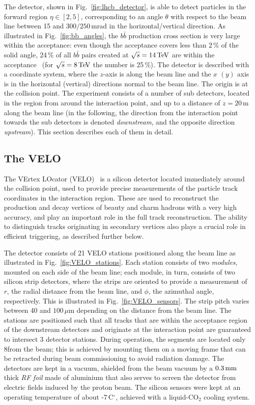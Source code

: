 The \lhcb detector, shown in Fig.~\ref{fig:lhcb_detector},  is able to detect particles in the forward region $\eta\in[2, 5]$, corresponding to an angle $\theta$ with respect to the beam line between 15 and $300/250$\,mrad in the horizontal/vertical direction. As illustrated in Fig.~\ref{fig:bb_angles}, the $b\bar b$ production cross section is very large within the \lhcb acceptance: even though the acceptance covers less than 2\,\% of the solid angle,  24\,\% of all $b\bar b$ pairs created at $\sqrt{s}=14\text{\,Te\kern -0.1em V}$ are within the acceptance~\cite{bbangles} (for $\sqrt{s}=8\text{\,Te\kern -0.1em V}$ the number is 25\,\%). The detector is described with a coordinate system, where the $z$-axis is along the beam line and the $x$ $(y)$ axis is in the horizontal (vertical) directions normal to the beam line. The origin is at the collision point. The experiment consists of a number of sub detectors, located in the region from around the interaction point, and up to a distance of $z=20\,$m along the beam line (in the following, the direction from the interaction point towards the sub detectors is denoted \emph{downstream}, and the opposite direction \emph{upstream}). This section describes each of them in detail.
 
\subsection{The VELO} %
\label{sub:the_velo}
The VErtex LOcator (VELO)~\cite{VELO-TDR} is a silicon detector located immediately around the collision point, used to provide precise measurements of the particle track coordinates in the interaction region. These are used to reconstruct the production and decay vertices of beauty and charm hadrons with a very high accuracy,  and play an important role in the full track reconstruction. The ability to distinguish tracks originating in secondary vertices also plays a crucial role in efficient triggering, as described further below.

The detector consists of 21 VELO stations positioned along the beam line as illustrated in Fig.~\ref{fig:VELO_stations}. Each station consists of two \emph{modules}, mounted on each side of the beam line; each module, in turn, consists of two silicon strip detectors,  where the strips are oriented to provide a measurement of $r$, the radial distance from the beam line, and  $\phi$, the azimuthal angle, respectively. This is illustrated in Fig.~\ref{fig:VELO_sensors}. The strip pitch varies between 40 and $100\,\mu$m depending on the distance from the beam line.  The stations are positioned such that all tracks that are within the acceptance region of the downstream detectors and originate at the interaction point are guaranteed to intersect 3 detector stations. During operation, the segments are located only 8\mm from the beam; this is achieved by mounting them on a moving frame that can be retracted during beam commissioning to avoid radiation damage. The detectors are kept in a vacuum, shielded from the beam vacuum by a $0.3\text{\,mm}$ thick \emph{RF foil} made of aluminium that also serves to screen the detector from electric fields induced by the proton beam. The silicon sensors were kept at an operating temperature of about -7\,C$^\circ$, achieved with a liquid-CO$_2$ cooling system.

